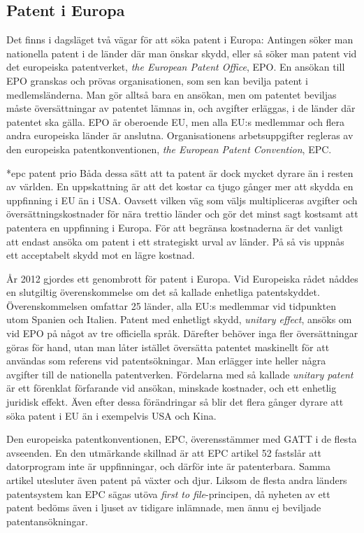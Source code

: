 \subsection{Patent i Europa}

Det finns i dagsläget två vägar för att söka patent i Europa:
Antingen söker man nationella patent i de länder där man önskar skydd, eller så söker man patent vid det europeiska patentverket, \emph{the European Patent Office}, EPO.
En ansökan till EPO granskas och prövas organisationen, som sen kan bevilja patent i medlemsländerna.
Man gör alltså bara en ansökan, men om patentet beviljas måste översättningar av patentet lämnas in, och avgifter erläggas, i de länder där patentet ska gälla.
EPO är oberoende EU, men alla EU:s medlemmar och flera andra europeiska länder är anslutna.
Organisationens arbetsuppgifter regleras av den europeiska patentkonventionen, \emph{the European Patent Convention}, EPC.

*epc patent prio
Båda dessa sätt att ta patent är dock mycket dyrare än i resten av världen.
En uppskattning är att det kostar ca tjugo gånger mer att skydda en uppfinning i EU än i USA.
Oavsett vilken väg som väljs multipliceras avgifter och översättningskostnader för nära trettio länder och gör det minst sagt kostsamt
att patentera en uppfinning i Europa.
För att begränsa kostnaderna är det vanligt att endast ansöka om patent i ett strategiskt urval av länder.
På så vis uppnås ett acceptabelt skydd mot en lägre kostnad.

År 2012 gjordes ett genombrott för patent i Europa.
Vid Europeiska rådet nåddes en slutgiltig överenskommelse om det så kallade enhetliga patentskyddet. 
Överenskommelsen omfattar 25 länder, alla EU:s medlemmar vid tidpunkten utom Spanien och Italien. 
Patent med enhetligt skydd, \emph{unitary effect}, ansöks om vid EPO på något av tre officiella språk.
Därefter behöver inga fler översättningar göras för hand, utan man låter istället översätta patentet maskinellt för att användas som referens vid patentsökningar.
Man erlägger inte heller några avgifter till de nationella patentverken.
Fördelarna med så kallade \emph{unitary patent} är ett förenklat förfarande vid ansökan, minskade kostnader, och ett enhetlig juridisk effekt.
Även efter dessa förändringar så blir det flera gånger dyrare att söka patent i EU än i exempelvis USA och Kina.

Den europeiska patentkonventionen, EPC, överensstämmer med GATT i de flesta avseenden.
En den utmärkande skillnad är att EPC artikel 52 fastslår att datorprogram inte är uppfinningar, och därför inte är patenterbara.
Samma artikel utesluter även patent på växter och djur.
Liksom de flesta andra länders patentsystem kan EPC sägas utöva \emph{first to file}-principen, då nyheten av ett patent bedöms även i ljuset av tidigare inlämnade, men ännu ej beviljade patentansökningar.


